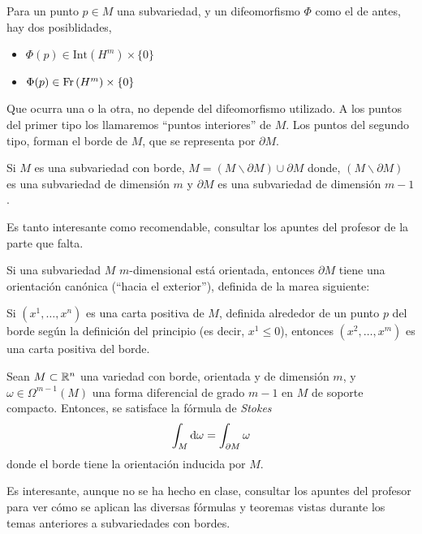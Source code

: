 \begin{defi}
    Para un punto $p \in M$ una subvariedad, y un difeomorfismo $\Phi$ como el de antes, hay dos posiblidades,
    \begin{itemize}
        \item $\Phi(p) \in \text{Int}\left( H^m \right) \times \{0\}$
        \item $\Phi(p) \in \operatorname{Fr} \left( H^m \right) \times \{0\}$
    \end{itemize}
    Que ocurra una o la otra, no depende del difeomorfismo utilizado. A los puntos del primer tipo los llamaremos
    ``puntos interiores'' de $M$. Los puntos del segundo tipo, forman el borde de $M$, que se representa por $\partial M$.
\end{defi}

\begin{prop}
    Si $M$ es una subvariedad con borde, $M = \left( M \smallsetminus \partial M \right) \cup \partial M$ donde,
    $\left( M \smallsetminus \partial M \right)$ es una subvariedad de dimensión $m$ y $\partial M$ es una subvariedad
    de dimensión $m-1$.
\end{prop}

Es tanto interesante como recomendable, consultar los apuntes del profesor de la parte que falta.

\setcounter{lema}{7}

\begin{prop}
    Si una subvariedad $M$ $m$-dimensional está orientada, entonces $\partial M$ tiene una orientación canónica (``hacia el
    exterior''), definida de la marea siguiente:

    Si $\left( x^1, \dots, x^n \right)$ es una carta positiva de $M$, definida alrededor de un punto $p$ del borde según la definición
    del principio (es decir, $x^1 \leq 0$), entonces $\left( x^2, \dots, x^m \right)$ es una carta positiva del borde.
\end{prop}

\begin{teo}[de Stokes]
    Sean $M \subset \mathbb{R}^n$ una variedad con borde, orientada y de dimensión $m$, y $\omega \in \Omega^{m-1}(M)$ una forma
    diferencial de grado $m-1$ en $M$ de soporte compacto. Entonces, se satisface la fórmula de \emph{Stokes}
    \[
        \int_M \dif \omega = \int_{\partial M} \omega
    \]
    donde el borde tiene la orientación inducida por $M$.
\end{teo}

Es interesante, aunque no se ha hecho en clase, consultar los apuntes del profesor para ver cómo se aplican las diversas fórmulas
y teoremas vistas durante los temas anteriores a subvariedades con bordes.
